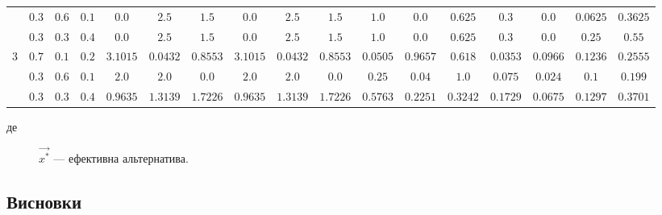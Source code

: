 \begin{landscape}
\begin{table}[H]
\begin{tabular}{c|c c c|c c c|c c c|c c c|c c c|c}
            & $0.3$ & $0.6$ & $0.1$ 
            & $0.0$ & $2.5$ & $1.5$
            & $0.0$ & $2.5$ & $1.5$
            & $1.0$ & $0.0$ & $0.625$
            & $0.3$ & $0.0$ & $0.0625$
            & $0.3625$ \\

            & $0.3$ & $0.3$ & $0.4$ 
            & $0.0$ & $2.5$ & $1.5$
            & $0.0$ & $2.5$ & $1.5$
            & $1.0$ & $0.0$ & $0.625$
            & $0.3$ & $0.0$ & $0.25$
            & $0.55$ \\
            \hline

            \multirow{3}{*}{3}
            & $0.7$ & $0.1$ & $0.2$ 
            & $3.1015$ & $0.0432$ & $0.8553$
            & $3.1015$ & $0.0432$ & $0.8553$
            & $0.0505$ & $0.9657$ & $0.618$
            & $0.0353$ & $0.0966$ & $0.1236$
            & $0.2555$ \\

            & $0.3$ & $0.6$ & $0.1$ 
            & $2.0$ & $2.0$ & $0.0$
            & $2.0$ & $2.0$ & $0.0$
            & $0.25$ & $0.04$ & $1.0$
            & $0.075$ & $0.024$ & $0.1$
            & $0.199$ \\

            & $0.3$ & $0.3$ & $0.4$ 
            & $0.9635$ & $1.3139$ & $1.7226$
            & $0.9635$ & $1.3139$ & $1.7226$
            & $0.5763$ & $0.2251$ & $0.3242$
            & $0.1729$ & $0.0675$ & $0.1297$
            & $0.3701$ \\
        \end{tabular}
        \end{table}
        \begin{description}
            \item[де] $\vec{x^*}$ --- ефективна альтернатива.
        \end{description}
    \end{landscape}

\subsection{Висновки}

